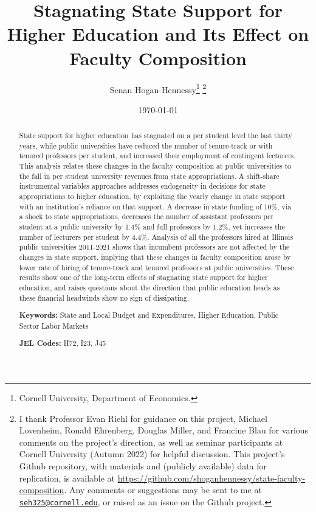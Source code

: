 \documentclass[notitlepage,12pt]{article}
\author{Senan Hogan-Hennessy\thanks{
    Cornell University, Department of Economics.}
    \thanks{I thank Professor Evan Riehl for guidance on this project, Michael Lovenheim, Ronald Ehrenberg, Douglas Miller, and Francine Blau for various comments on the project's direction, as well as seminar participants at Cornell University (Autumn 2022) for helpful discussion.
    This project's Github repository, with materials and (publicly available) data for replication, is available at 
    \url{https://github.com/shoganhennessy/state-faculty-composition}.
    Any comments or suggestions may be sent to me at \href{mailto:seh325@cornell.edu}{\nolinkurl{seh325@cornell.edu}}, or raised as an issue on the Github project.}}
\title{Stagnating State Support for Higher Education and Its Effect on Faculty Composition}
\date{\today}
\begin{document}
\clearpage \maketitle
\thispagestyle{empty}
\begin{abstract}
\noindent
State support for higher education has stagnated on a per student level the last thirty years, while public universities have reduced the number of tenure-track or with tenured professors per student, and increased their employment of contingent lecturers.
This analysis relates these changes in the faculty composition at public universities to the fall in per student university revenues from state appropriations.
A shift-share instrumental variables approaches addresses endogeneity in decisions for state appropriations to higher education, by exploiting the yearly change in state support with an institution's reliance on that support.
A decrease in state funding of 10\%, via a shock to state appropriations, decreases the number of assistant professors per student at a public university by 1.4\% and full professors by 1.2\%, yet increases the number of lecturers per student by 4.4\%.
Analysis of all the professors hired at Illinois public universities 2011-2021 shows that incumbent professors are not affected by the changes in state support, implying that these changes in faculty composition arose by lower rate of hiring of tenure-track and tenured professors at public universities.
These results show one of the long-term effects of stagnating state support for higher education, and raises questions about the direction that public education heads as these financial headwinds show no sign of dissipating.

\vspace{0.75cm}
\noindent\textbf{Keywords:}
State and Local Budget and Expenditures,
Higher Education,
Public Sector Labor Markets

\vspace{0.5cm}
\noindent\textbf{JEL Codes:} H72, I23, J45
\end{abstract}
\newpage
\setcounter{page}{1}
\newpage
\doublespacing
\end{document}
